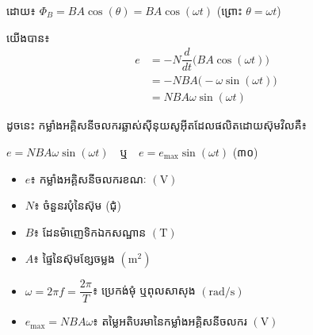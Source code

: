 \noindent
ដោយ៖ $\Phi_B = BA\cos(\theta) = BA\cos(\omega t)$ \quad (ព្រោះ $\theta = \omega t$)

\vspace{0.3em}
\noindent
យើងបាន៖
\begin{align*}
	e &= -N\dfrac{d}{dt}\Big(BA\cos(\omega t)\Big) \\[0.4em]
	&= -NBA\Big(-\omega\sin(\omega t)\Big) \\[0.4em]
	&= NBA\omega\sin(\omega t)
\end{align*}

\vspace{0.2em}
\noindent
ដូចនេះ កម្លាំងអគ្គិសនីចលករឆ្លាស់ស៊ីនុយសូអុីតដែលផលិតដោយស៊ុមវិលគឺ៖
\begin{center}
	$\boxed{e = NBA\omega\sin(\omega t) \quad \text{ឬ} \quad e = e_{\max}\sin(\omega t)}$ \quad (៣០)
\end{center}

\vspace{0.3em}
\noindent
\begin{minipage}[t]{0.48\textwidth}
	\begin{itemize}[itemsep=2pt, topsep=1pt, parsep=0pt, leftmargin=1.5em]
		\item $e$៖ កម្លាំងអគ្គិសនីចលករខណៈ $(\mathrm{V})$
		\item $N$៖ ចំនួនរបុំនៃស៊ុម (ជុំ)
		\item $B$៖ ដែនម៉ាញេទិកឯកសណ្ឋាន $(\mathrm{T})$
		\item $A$៖ ផ្ទៃនៃស៊ុមខ្សែចម្លង $(\mathrm{m}^2)$
	\end{itemize}
\end{minipage}%
\hfill
\begin{minipage}[t]{0.48\textwidth}
	\begin{itemize}[itemsep=2pt, topsep=1pt, parsep=0pt, leftmargin=1.5em]
		\item $\omega = 2\pi f = \dfrac{2\pi}{T}$៖ ប្រេកង់មុំ ឬពុលសាសុង $(\mathrm{rad/s})$
		\item $e_{\max} = NBA\omega$៖ តម្លៃអតិបរមានៃកម្លាំងអគ្គិសនីចលករ $(\mathrm{V})$
	\end{itemize}
\end{minipage}

\vspace{0.4em}

